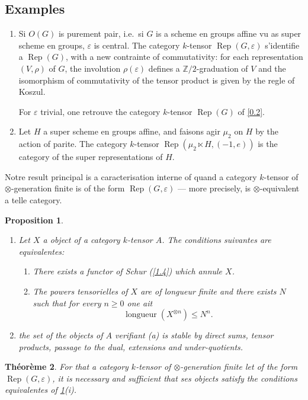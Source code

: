 \documentclass[11pt,a4paper]{article}
\theoremstyle{plain}
\newtheorem{theorem}{Th\'eor\`eme}
\newtheorem{proposition}[theorem]{Proposition}
\theoremstyle{definition}
\DeclareMathOperator{\longueur}{longueur}
\newcommand{\Rep}{\operatorname{Rep}}
\begin{document}
\subsection{Examples}
\label{0.4}

\begin{enumerate}
\item[(i)] Si $O(G)$ is purement pair, i.e.~si $G$ is a scheme en groups affine vu as super scheme en groups, $\varepsilon$ is central. The category $k$-tensor $\Rep(G,\varepsilon)$ s'identifie a $\Rep(G)$, with a new contrainte of commutativity: for each representation $(V,\rho)$ of $G$, the involution $\rho(\varepsilon)$ defines a $\mathbb{Z}/2$-graduation of $V$ and the isomorphism of commutativity of the tensor product is given by the regle of Koszul.

For $\varepsilon$ trivial, one retrouve the category $k$-tensor $\Rep(G)$ of \ref{0.2}.
\item[(ii)] Let $H$ a super scheme en groups affine, and faisons agir $\mu_2$ on $H$ by the action of parite. The category $k$-tensor $\Rep(\mu_2\ltimes H,(-1,e))$ is the category of the super representations of $H$.
\end{enumerate}

Notre result principal is a caracterisation interne of quand a category $k$-tensor of $\otimes$-generation finite is of the form $\Rep(G,\varepsilon)$ --- more precisely, is $\otimes$-equivalent a telle category.

\begin{proposition}\label{0.5}
\begin{enumerate}
\item[(i)] Let $X$ a object of a category $k$-tensor $A$. The conditions suivantes are equivalentes:
\begin{enumerate}
\item[(a)] There exists a functor of Schur (\ref{1.4}) which annule $X$.
\item[(b)] The powers tensorielles of $X$ are of longueur finite and there exists $N$ such that for every $n\geq0$ one ait
\[
\longueur(X^{\otimes n})\leq N^n.
\]
\end{enumerate}
\item[(ii)] the set of the objects of $A$ verifiant (a) is stable by direct sums, tensor products, passage to the dual, extensions and under-quotients.
\end{enumerate}
\end{proposition}

\begin{theorem}\label{0.6}
For that a category $k$-tensor of $\otimes$-generation finite let of the form $\Rep(G,\varepsilon)$, it is necessary and sufficient that ses objects satisfy the conditions equivalentes of \ref{0.5}(i).
\end{theorem}
\end{document}
